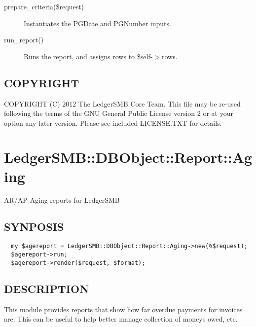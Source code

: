 \begin{description}
\begin{description}
\begin{description}
\begin{description}
\begin{description}
\begin{description}
\begin{description}
\begin{description}
\begin{description}
\begin{description}
\begin{description}
\item[{prepare\_criteria(\$request)}] \mbox{}

Instantiates the PGDate and PGNumber inputs.


\item[{run\_report()}] \mbox{}

Runs the report, and assigns rows to \$self-$>$rows.

\end{description}
\subsection*{COPYRIGHT\label{LedgerSMB::DBObject::Report::Unapproved::Drafts_COPYRIGHT}}


COPYRIGHT (C) 2012 The LedgerSMB Core Team.  This file may be re-used following
the terms of the GNU General Public License version 2 or at your option any
later version.  Please see included LICENSE.TXT for details.

\section{LedgerSMB::DBObject::Report::Aging\label{LedgerSMB::DBObject::Report::Aging}}


AR/AP Aging reports for LedgerSMB

\subsection*{SYNPOSIS\label{LedgerSMB::DBObject::Report::Aging_SYNPOSIS}}
\begin{verbatim}
  my $agereport = LedgerSMB::DBObject::Report::Aging->new(%$request);
  $agereport->run;
  $agereport->render($request, $format);
\end{verbatim}
\subsection*{DESCRIPTION\label{LedgerSMB::DBObject::Report::Aging_DESCRIPTION}}


This module provides reports that show how far overdue payments for invoices
are.  This can be useful to help better manage collection of moneys owed, etc.




\end{description}
\end{description}
\end{description}
\end{description}
\end{description}
\end{description}
\end{description}
\end{description}
\end{description}
\end{description}
